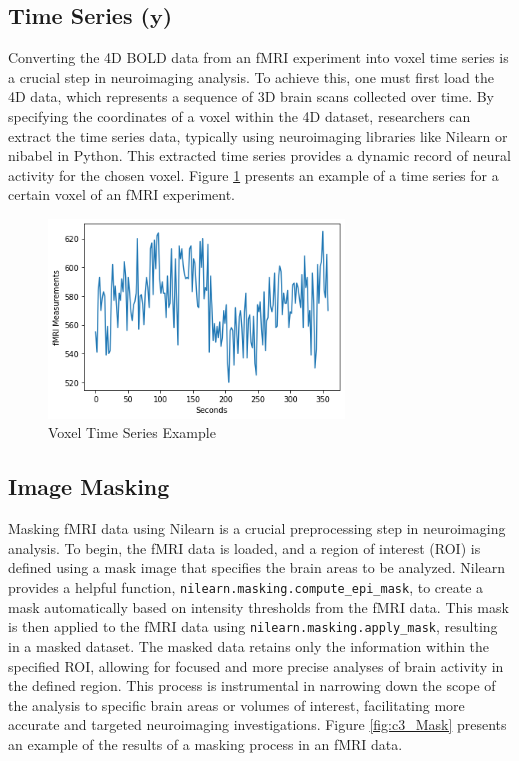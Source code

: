 \subsection{Time Series ($\bm{y}$)}

Converting the 4D BOLD data from an fMRI experiment into voxel time series is a crucial step in neuroimaging analysis. To achieve this, one must first load the 4D data, which represents a sequence of 3D brain scans collected over time. By specifying the coordinates of a voxel within the 4D dataset, researchers can extract the time series data, typically using neuroimaging libraries like Nilearn or nibabel in Python. This extracted time series provides a dynamic record of neural activity for the chosen voxel. Figure \ref{fig:c3_TimeSeries} presents an example of a time series for a certain voxel of an fMRI experiment.

\begin{figure}[htbp!]
\centering
\includegraphics[width=0.7\textwidth]{images/TimeSeries.png}
\caption{Voxel Time Series Example}
\label{fig:c3_TimeSeries}
\end{figure}

\subsection{Image Masking}

Masking fMRI data using Nilearn is a crucial preprocessing step in neuroimaging analysis. To begin, the fMRI data is loaded, and a region of interest (ROI) is defined using a mask image that specifies the brain areas to be analyzed. Nilearn provides a helpful function, \texttt{nilearn.masking.compute\_epi\_mask}, to create a mask automatically based on intensity thresholds from the fMRI data. This mask is then applied to the fMRI data using \texttt{nilearn.masking.apply\_mask}, resulting in a masked dataset. The masked data retains only the information within the specified ROI, allowing for focused and more precise analyses of brain activity in the defined region. This process is instrumental in narrowing down the scope of the analysis to specific brain areas or volumes of interest, facilitating more accurate and targeted neuroimaging investigations. Figure \ref{fig:c3_Mask} presents an example of the results of a masking process in an fMRI data.

